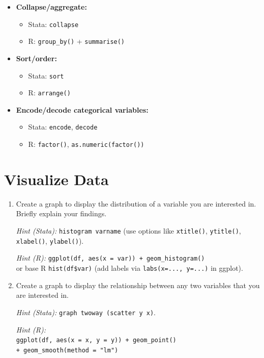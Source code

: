 \documentclass[paper=a4, fontsize=11pt]{scrartcl} %
\begin{document}
\begin{enumerate}
\begin{itemize}
\item \textbf{Collapse/aggregate:}
\begin{itemize}
\item Stata: \texttt{collapse}
\item R: \texttt{group\_by()} + \texttt{summarise()}
\end{itemize}

\item \textbf{Sort/order:}
\begin{itemize}
\item Stata: \texttt{sort}
\item R: \texttt{arrange()}
\end{itemize}

\item \textbf{Encode/decode categorical variables:}
\begin{itemize}
\item Stata: \texttt{encode}, \texttt{decode}
\item R: \texttt{factor()}, \texttt{as.numeric(factor())}
\end{itemize}
\end{itemize}

\end{enumerate}

\vspace{0.3cm}


\section{Visualize Data}

\begin{enumerate}
\item Create a graph to display the distribution of a variable you are interested in. Briefly explain your findings.

\textit{Hint (Stata):} \texttt{histogram varname} (use options like \texttt{xtitle()}, \texttt{ytitle()}, \texttt{xlabel()}, \texttt{ylabel()}).

\textit{Hint (R):} \texttt{ggplot(df, aes(x = var)) + geom\_histogram()} \\
or base R \texttt{hist(df\$var)} (add labels via \texttt{labs(x=..., y=...)} in ggplot).

\item Create a graph to display the relationship between any two variables that you are interested in.

\textit{Hint (Stata):} \texttt{graph twoway (scatter y x)}.

\textit{Hint (R):} \\
\texttt{ggplot(df, aes(x = x, y = y)) + geom\_point()} \\
\texttt{+ geom\_smooth(method = "lm")}
\end{enumerate}
\end{document}
